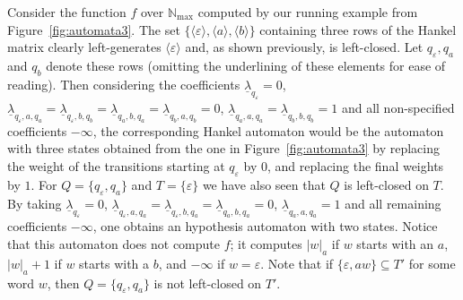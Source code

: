 \documentclass{lmcs}
\numberwithin{theorem}{section}
\begin{document}
 \begin{exa}
Consider the function $f$ over $\mathbb{N}_{\max}$ computed by our running example from Figure~\ref{fig:automata3}. The set $\{ \langle \varepsilon \rangle, \langle a \rangle, \langle b \rangle\}$ containing three rows of the Hankel matrix clearly left-generates $\langle \varepsilon \rangle$ and, as shown previously, is left-closed. Let $q_\varepsilon, q_a$ and $q_b$ denote these rows (omitting the underlining of these elements for ease of reading). Then considering the coefficients $\underline{\lambda}_{q_\varepsilon}=0$, $\underline{\lambda}_{q_\varepsilon,a,q_a} = \underline{\lambda}_{q_\varepsilon,b,q_b} = \underline{\lambda}_{q_a,b,q_a} = \underline{\lambda}_{q_b,a,q_b} = 0$, $\underline{\lambda}_{q_a,a, q_a} = \underline{\lambda}_{q_b,b,q_b} = 1$ and all non-specified coefficients $-\infty$, the corresponding Hankel automaton would be the automaton with three states obtained from the one in Figure~\ref{fig:automata3} by replacing the weight of the transitions starting at $q_{\varepsilon}$ by $0$, and replacing the final weights by $1$. For $Q = \{q_\varepsilon, q_ a\}$ and $T = \{\varepsilon\}$ we have also seen that $Q$ is left-closed on $T$. By taking $\underline{\lambda}_{q_\varepsilon}=0$, $\underline{\lambda}_{q_\varepsilon,a,q_a} = \underline{\lambda}_{q_\varepsilon,b,q_a} = \underline{\lambda}_{q_a,b,q_a} = 0$, $\underline{\lambda}_{q_a,a, q_a} = 1$ and all remaining coefficients $-\infty$, one obtains an hypothesis automaton with two states. Notice that this automaton does not compute $f$; it computes $|w|_a$ if $w$ starts with an $a$, $|w|_a + 1$ if $w$ starts with a $b$, and $-\infty$ if $w =\varepsilon$. Note that if $ \{\varepsilon, aw\} \subseteq T'$ for some word $w$, then $Q = \{q_\varepsilon, q_ a\}$ is not left-closed on $T'$. 
\end{exa}
\end{document}
